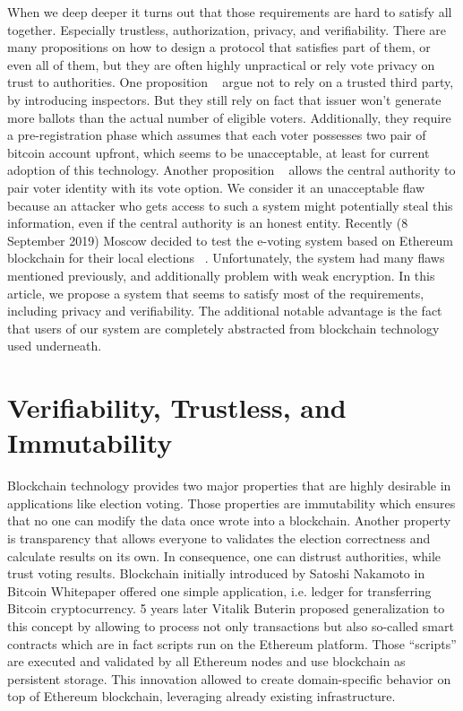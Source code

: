 \documentclass[runningheads]{llncs}
\begin{document}
When we deep deeper it turns out that those requirements are hard to satisfy all together. Especially trustless, authorization, privacy, and verifiability. There are many propositions on how to design a protocol that satisfies part of them, or even all of them, but they are often highly unpractical or rely vote privacy on trust to authorities. One proposition ~\cite{liu2017voting} argue not to rely on a trusted third party, by introducing inspectors. But they still rely on fact that issuer won't generate more ballots than the actual number of eligible voters. Additionally, they require a pre-registration phase which assumes that each voter possesses two pair of bitcoin account upfront, which seems to be unacceptable, at least for current adoption of this technology. Another proposition ~\cite{hardwick2018voting} allows the central authority to pair voter identity with its vote option. We consider it an unacceptable flaw because an attacker who gets access to such a system might potentially steal this information, even if the central authority is an honest entity. Recently (8 September 2019) Moscow decided to test the e-voting system based on Ethereum blockchain for their local elections ~\cite{gaudry2019breaking}. Unfortunately, the system had many flaws mentioned previously, and additionally problem with weak encryption.  
In this article, we propose a system that seems to satisfy most of the requirements, including privacy and verifiability. The additional notable advantage is the fact that users of our system are completely abstracted from blockchain technology used underneath.



\section{Verifiability, Trustless, and Immutability}
Blockchain technology provides two major properties that are highly desirable in applications like election voting. Those properties are immutability which ensures that no one can modify the data once wrote into a blockchain. Another property is transparency that allows everyone to validates the election correctness and calculate results on its own. In consequence, one can distrust authorities, while trust voting results. 
Blockchain initially introduced by Satoshi Nakamoto in Bitcoin Whitepaper offered one simple application, i.e. ledger for transferring Bitcoin cryptocurrency. 5 years later Vitalik Buterin proposed generalization to this concept by allowing to process not only transactions but also so-called smart contracts which are in fact scripts run on the Ethereum platform. Those “scripts” are executed and validated by all Ethereum nodes and use blockchain as persistent storage. This innovation allowed to create domain-specific behavior on top of Ethereum blockchain, leveraging already existing infrastructure.
\end{document}

